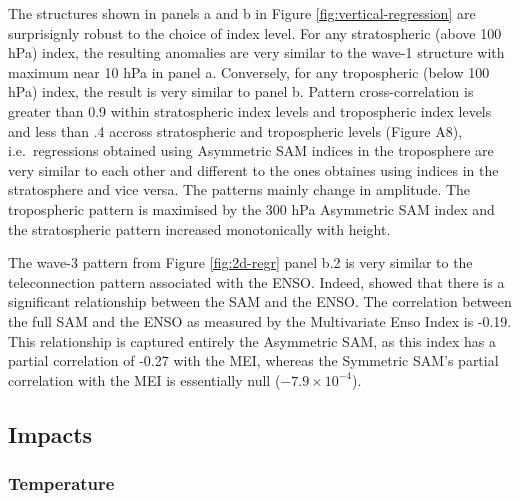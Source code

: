\documentclass[]{ametsocV5}
\begin{document}
The structures shown in panels a and b in Figure
\ref{fig:vertical-regression} are surprisignly robust to the choice of
index level. For any stratospheric (above 100 hPa) index, the resulting
anomalies are very similar to the wave-1 structure with maximum near 10
hPa in panel a. Conversely, for any tropospheric (below 100 hPa) index,
the result is very similar to panel b. Pattern cross-correlation is
greater than 0.9 within stratospheric index levels and tropospheric
index levels and less than .4 accross stratospheric and tropospheric
levels (Figure A8), i.e.~regressions obtained using Asymmetric SAM
indices in the troposphere are very similar to each other and different
to the ones obtaines using indices in the stratosphere and vice versa.
The patterns mainly change in amplitude. The tropospheric pattern is
maximised by the 300 hPa Asymmetric SAM index and the stratospheric
pattern increased monotonically with height.

The wave-3 pattern from Figure \ref{fig:2d-regr} panel b.2 is very
similar to the teleconnection pattern associated with the ENSO. Indeed,
\citet{fogt2011} showed that there is a significant relationship between
the SAM and the ENSO. The correlation between the full SAM and the ENSO
as measured by the Multivariate Enso Index \citep{wolter2011} is -0.19.
This relationship is captured entirely the Asymmetric SAM, as this index
has a partial correlation of -0.27 with the MEI, whereas the Symmetric
SAM's partial correlation with the MEI is essentially null
(\ensuremath{-7.9\times 10^{-4}}).

\subsection{Impacts}

\subsubsection{Temperature}
\end{document}
